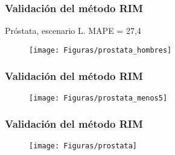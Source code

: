 \documentclass{beamer}
\begin{document}


\begin{frame}\frametitle{Validación del método RIM}

Próstata, escenario L. MAPE = 27,4
\begin{figure}
	\centering
	\texttt{[image: Figuras/prostata\_hombres]}
\end{figure}

\end{frame}




\begin{frame}\frametitle{Validación del método RIM}
\vspace{-10pt}
\begin{figure}
	\centering
	\texttt{[image: Figuras/prostata\_menos5]}
\end{figure}

\end{frame}


\begin{frame}\frametitle{Validación del método RIM}
\vspace{-10pt}

\begin{figure}
\centering
\texttt{[image: Figuras/prostata]}
\end{figure}

\end{frame}

\end{document}

